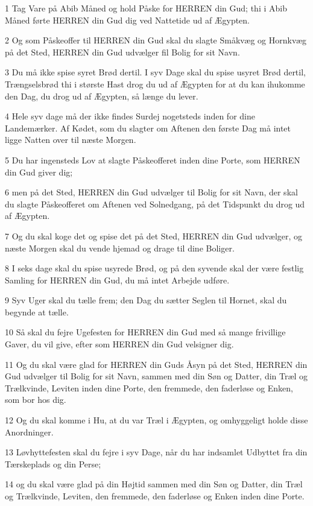\par 1 Tag Vare på Abib Måned og hold Påske for HERREN din Gud; thi i Abib Måned førte HERREN din Gud dig ved Nattetide ud af Ægypten.
\par 2 Og som Påskeoffer til HERREN din Gud skal du slagte Småkvæg og Hornkvæg på det Sted, HERREN din Gud udvælger fil Bolig for sit Navn.
\par 3 Du må ikke spise syret Brød dertil. I syv Dage skal du spise usyret Brød dertil, Trængselsbrød thi i største Hast drog du ud af Ægypten for at du kan ihukomme den Dag, du drog ud af Ægypten, så længe du lever.
\par 4 Hele syv dage må der ikke findes Surdej nogetsteds inden for dine Landemærker. Af Kødet, som du slagter om Aftenen den første Dag må intet ligge Natten over til næste Morgen.
\par 5 Du har ingensteds Lov at slagte Påskeofferet inden dine Porte, som HERREN din Gud giver dig;
\par 6 men på det Sted, HERREN din Gud udvælger til Bolig for sit Navn, der skal du slagte Påskeofferet om Aftenen ved Solnedgang, på det Tidspunkt du drog ud af Ægypten.
\par 7 Og du skal koge det og spise det på det Sted, HERREN din Gud udvælger, og næste Morgen skal du vende hjemad og drage til dine Boliger.
\par 8 I seks dage skal du spise usyrede Brød, og på den syvende skal der være festlig Samling for HERREN din Gud, du må intet Arbejde udføre.
\par 9 Syv Uger skal du tælle frem; den Dag du sætter Seglen til Hornet, skal du begynde at tælle.
\par 10 Så skal du fejre Ugefesten for HERREN din Gud med så mange frivillige Gaver, du vil give, efter som HERREN din Gud velsigner dig.
\par 11 Og du skal være glad for HERREN din Guds Åsyn på det Sted, HERREN din Gud udvælger til Bolig for sit Navn, sammen med din Søn og Datter, din Træl og Trælkvinde, Leviten inden dine Porte, den fremmede, den faderløse og Enken, som bor hos dig.
\par 12 Og du skal komme i Hu, at du var Træl i Ægypten, og omhyggeligt holde disse Anordninger.
\par 13 Løvhyttefesten skal du fejre i syv Dage, når du har indsamlet Udbyttet fra din Tærskeplads og din Perse;
\par 14 og du skal være glad på din Højtid sammen med din Søn og Datter, din Træl og Trælkvinde, Leviten, den fremmede, den faderløse og Enken inden dine Porte.
